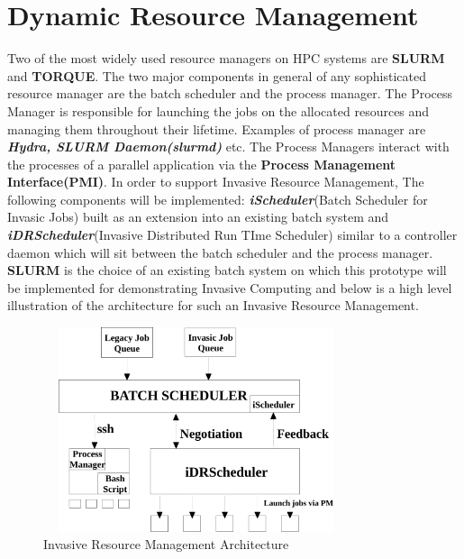 \section{Dynamic Resource Management}
Two of the most widely used resource managers on HPC systems are \textbf{SLURM} and \textbf{TORQUE}. The two major components in general of any sophisticated resource manager are the batch scheduler and the process manager. The Process Manager is responsible for launching the jobs on the allocated resources and managing them throughout their lifetime. Examples of process manager are \textbf{\textit{Hydra, SLURM Daemon(slurmd)}} etc. The Process Managers interact with the processes of a parallel application via the \textbf{Process Management Interface(PMI)}. In order to support Invasive Resource Management, The following components will be implemented: \textbf{\textit{iScheduler}}(Batch Scheduler for Invasic Jobs) built as an extension into an existing batch system and \textbf{\textit{iDRScheduler}}(Invasive Distributed Run TIme Scheduler) similar to a controller daemon which will sit between the batch scheduler and the process manager. \textbf{SLURM} is the choice of an existing batch system on which this prototype will be implemented for demonstrating Invasive Computing and below is a high level illustration of the architecture for such an Invasive Resource Management.\\ \par
\begin{figure}[!htbp]
\centering
\includegraphics[width=0.8\textwidth, height=60mm]{./figures/architecture.pdf}
\caption{Invasive Resource Management Architecture}
\label{fig:1}
\end{figure}
\noindent

